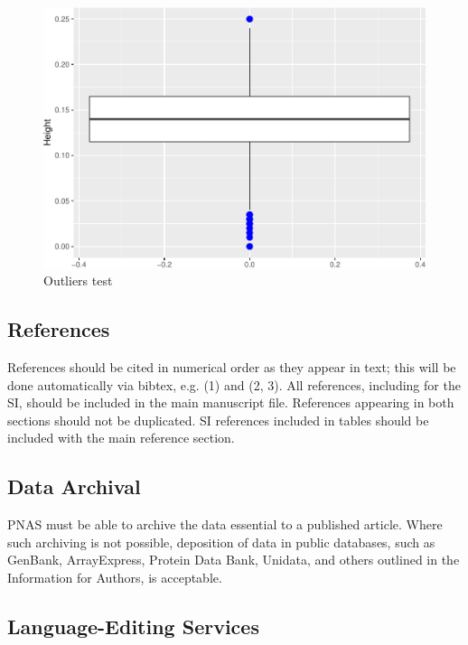 \documentclass[9pt,twocolumn,twoside,]{pnas-new}
\begin{document}
\begin{figure}
\includegraphics[width=0.98\columnwidth]{project_rticles_files/figure-latex/plot3-1} \caption{Outliers test}\label{fig:plot3}
\end{figure}

\subsection*{References}\label{references}

References should be cited in numerical order as they appear in text;
this will be done automatically via bibtex, e.g. (1) and (2, 3). All
references, including for the SI, should be included in the main
manuscript file. References appearing in both sections should not be
duplicated. SI references included in tables should be included with the
main reference section.

\subsection*{Data Archival}\label{data-archival}

PNAS must be able to archive the data essential to a published article.
Where such archiving is not possible, deposition of data in public
databases, such as GenBank, ArrayExpress, Protein Data Bank, Unidata,
and others outlined in the Information for Authors, is acceptable.

\subsection*{Language-Editing Services}\label{language-editing-services}
\end{document}
